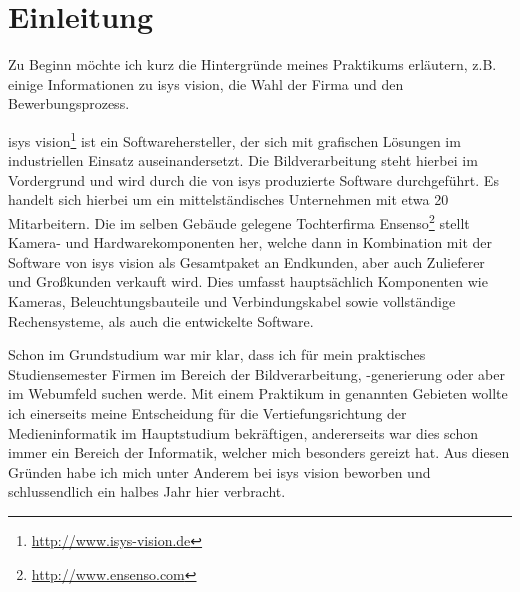 \chapter{Einleitung}
\label{ch:0}

Zu Beginn möchte ich kurz die Hintergründe meines Praktikums erläutern,
z.B. einige Informationen zu isys vision, die Wahl der Firma und den Bewerbungsprozess.

isys vision\footnote{\url{http://www.isys-vision.de}} ist ein Softwarehersteller, der sich mit grafischen Lösungen im industriellen Einsatz auseinandersetzt.
Die Bildverarbeitung steht hierbei im Vordergrund und wird durch die von isys produzierte
Software durchgeführt. Es handelt sich hierbei um ein mittelständisches Unternehmen mit etwa 20 Mitarbeitern. Die im selben Gebäude gelegene Tochterfirma Ensenso\footnote{\url{http://www.ensenso.com}} stellt
Kamera- und Hardwarekomponenten her, welche dann in Kombination mit der Software von isys vision
als Gesamtpaket an Endkunden, aber auch Zulieferer und Großkunden verkauft wird. Dies umfasst
hauptsächlich Komponenten wie Kameras, Beleuchtungsbauteile und Verbindungskabel
sowie vollständige Rechensysteme, als auch die entwickelte Software.

Schon im Grundstudium war mir klar, dass ich für mein praktisches Studiensemester
Firmen im Bereich der Bildverarbeitung, -generierung oder aber im Webumfeld suchen
werde. Mit einem Praktikum in genannten Gebieten wollte ich einerseits meine Entscheidung
für die Vertiefungsrichtung der Medieninformatik im Hauptstudium bekräftigen, andererseits
war dies schon immer ein Bereich der Informatik, welcher mich besonders gereizt
hat. Aus diesen Gründen habe ich mich unter Anderem bei isys vision beworben und
schlussendlich ein halbes Jahr hier verbracht.


